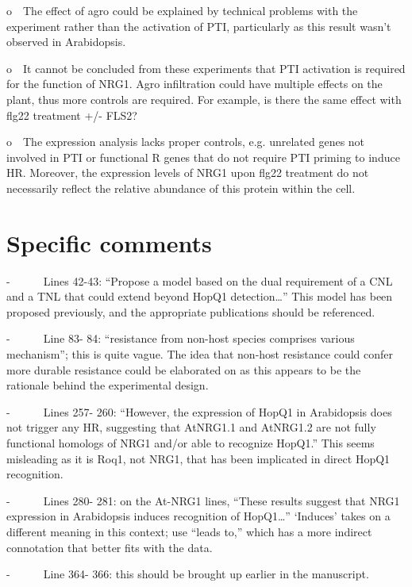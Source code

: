 \documentclass[10pt]{article}
\begin{document}
o~~The effect of agro could be explained by technical problems with the
experiment rather than the activation of PTI, particularly as this
result wasn't observed in Arabidopsis.

o~~It cannot be concluded from these experiments that PTI activation is
required for the function of NRG1. Agro infiltration could have multiple
effects on the plant, thus more controls are required. For example, is
there the same effect with flg22 treatment +/- FLS2?

\par\null

o~~The expression analysis lacks proper controls, e.g. unrelated genes
not involved in PTI or functional R genes that do not require PTI
priming to induce HR. Moreover, the expression levels of NRG1 upon flg22
treatment do not necessarily reflect the relative abundance of this
protein within the cell. ~\(\)

\section*{Specific comments}

{\label{687807}}\par\null

-~~~~~~Lines 42-43: ``Propose a model based on the dual requirement of a
CNL and a TNL that could extend beyond HopQ1 detection\ldots{}'' This
model has been proposed previously, and the appropriate publications
should be referenced.

-~~~~~~Line 83- 84: ``resistance from non-host species comprises various
mechanism''; this is quite vague. The idea that non-host resistance
could confer more durable resistance could be elaborated on as this
appears to be the rationale behind the experimental design.~

-~~~~~~Lines 257- 260: ``However, the expression of HopQ1 in Arabidopsis
does not trigger any HR, suggesting that AtNRG1.1 and AtNRG1.2 are not
fully functional homologs of NRG1 and/or able to recognize HopQ1.'' This
seems misleading as it is Roq1, not NRG1, that has been implicated in
direct HopQ1 recognition.

-~~~~~~Lines 280- 281: on the At-NRG1 lines, ``These results suggest
that NRG1 expression in Arabidopsis induces recognition of
HopQ1\ldots{}'' `Induces' takes on a different meaning in this context;
use ``leads to,'' which has a more indirect connotation that better fits
with the data.~

-~~~~~~Line 364- 366: this should be brought up earlier in the
manuscript.~
\end{document}
